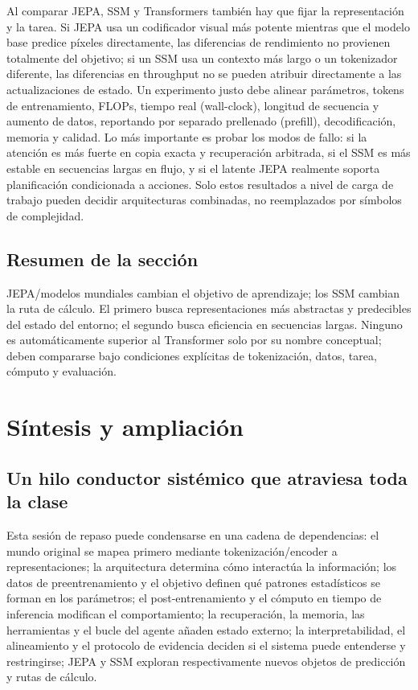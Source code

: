 \documentclass[a4paper]{article}
\begin{document}
Al comparar JEPA, SSM y Transformers también hay que fijar la representación y la tarea. Si JEPA usa un codificador visual más potente mientras que el modelo base predice píxeles directamente, las diferencias de rendimiento no provienen totalmente del objetivo; si un SSM usa un contexto más largo o un tokenizador diferente, las diferencias en throughput no se pueden atribuir directamente a las actualizaciones de estado. Un experimento justo debe alinear parámetros, tokens de entrenamiento, FLOPs, tiempo real (wall-clock), longitud de secuencia y aumento de datos, reportando por separado prellenado (prefill), decodificación, memoria y calidad. Lo más importante es probar los modos de fallo: si la atención es más fuerte en copia exacta y recuperación arbitrada, si el SSM es más estable en secuencias largas en flujo, y si el latente JEPA realmente soporta planificación condicionada a acciones. Solo estos resultados a nivel de carga de trabajo pueden decidir arquitecturas combinadas, no reemplazados por símbolos de complejidad.

\subsection{Resumen de la sección}

JEPA/modelos mundiales cambian el objetivo de aprendizaje; los SSM cambian la ruta de cálculo. El primero busca representaciones más abstractas y predecibles del estado del entorno; el segundo busca eficiencia en secuencias largas. Ninguno es automáticamente superior al Transformer solo por su nombre conceptual; deben compararse bajo condiciones explícitas de tokenización, datos, tarea, cómputo y evaluación.


\section{Síntesis y ampliación}

\subsection{Un hilo conductor sistémico que atraviesa toda la clase}

Esta sesión de repaso puede condensarse en una cadena de dependencias: el mundo original se mapea primero mediante tokenización/encoder a representaciones; la arquitectura determina cómo interactúa la información; los datos de preentrenamiento y el objetivo definen qué patrones estadísticos se forman en los parámetros; el post-entrenamiento y el cómputo en tiempo de inferencia modifican el comportamiento; la recuperación, la memoria, las herramientas y el bucle del agente añaden estado externo; la interpretabilidad, el alineamiento y el protocolo de evidencia deciden si el sistema puede entenderse y restringirse; JEPA y SSM exploran respectivamente nuevos objetos de predicción y rutas de cálculo.
\end{document}
